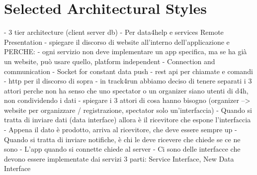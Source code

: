 \documentclass[../../DD.tex]{subfiles}
\begin{document}
\section{Selected Architectural Styles}
	- 3 tier architecture (client server db)
		- Per data4help e services Remote Presentation	 
		- spiegare il discorso di website all'interno dell'applicazione e PERCHE:
			- ogni servizio non deve implementare un app specifica, ma se ha già un website, può usare quello, platform independent
	- Connection and communication
		- Socket for constant data push
		- rest api per chiamate e comandi
		- http per il discorso di sopra
	- in track4run abbiamo deciso di tenere separati i 3 attori perche non ha senso che uno spectator o un organizer siano utenti di d4h, non condividendo i dati
		- spiegare i 3 attori di cosa hanno bisogno (organizer --> website per organizzare / registrazione, spectator solo un'interfaccia)
	- Quando si tratta di inviare dati (data interface) allora è il ricevitore che espone l'interfaccia
		- Appena il dato è prodotto, arriva al ricevitore, che deve essere sempre up
	- Quando si tratta di inviare notifiche, è chi le deve ricevere che chiede se ce ne sono
		- L'app quando si connette chiede al server
	- Ci sono delle interfacce che devono essere implementate dai servizi 3 parti: Service Interface, New Data Interface
\end{document}
